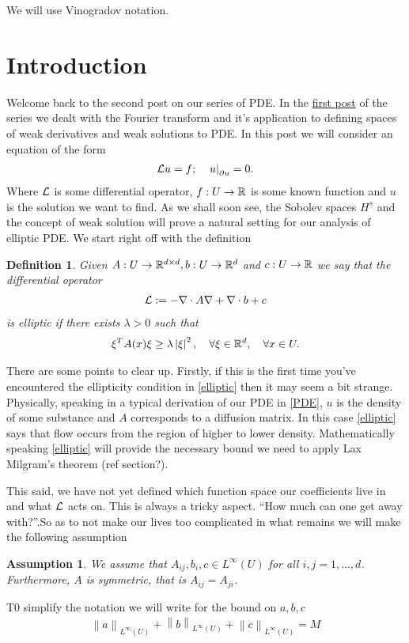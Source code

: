 \documentclass[12pt]{article}
\newtheorem{definition}{Definition}
\newtheorem{assumption}{Assumption}
\renewcommand{\norm}[1]{\left\lVert #1 \right\rVert}\renewcommand{\abs}[1]{\left| #1 \right|}
\newcommand\restr[2]{\left.#1\right|_{#2}}
\begin{document}
We will use Vinogradov notation.

\section{Introduction}
Welcome back to the second post on our series of PDE. In the \href{https://nowheredifferentiable.com/2023-01-29-PDE-1/}{first post} of the series we dealt with the Fourier transform and it's application to defining spaces of weak derivatives and weak solutions to PDE. In this post we will consider an equation of the form
\begin{align}\label{PDE}
	\Ll u =f; \quad \restr{u}{\partial u} =0.
\end{align}
Where $\mathcal{L}$ is some differential operator, $f: U \to  \mathbb{R}$  is some known function and $u$ is the solution we want to find. As we shall soon see, the Sobolev spaces $H^s$ and the concept of weak solution will prove a natural setting for our analysis of elliptic PDE. We start right off with the definition
\begin{definition}
	Given $A: U \to \mathbb{R}^{d \times d}, b: U \to \mathbb{R}^d$ and $c:U \to \mathbb{R}$ we say that the differential operator
	\begin{align}\label{operator}
		\mathcal{L}:= -\nabla \cdot A \nabla + \nabla \cdot b +c\end{align}
	is \emph{elliptic} if there exists $\lambda >0$ such that
	\begin{align}\label{elliptic}
		\xi ^TA(x) \xi  \geq \lambda \abs{\xi }^2 , \quad\forall \xi \in \R^d , \quad\forall x \in U .
	\end{align}
\end{definition}
There are some points to clear up. Firstly, if this is the first time you've encountered  the ellipticity condition in \eqref{elliptic} then it may seem a bit strange.  Physically, speaking in a typical derivation of our PDE in \eqref{PDE}, $u$ is the density of some substance and $A$ corresponds to a diffusion matrix. In this case \eqref{elliptic} says that flow occurs from the region of higher to lower density. Mathematically speaking \eqref{elliptic} will provide the necessary bound we need to apply Lax Milgram's theorem (ref section?).

This said, we have not yet defined which function space our coefficients live in and what $\mathcal{L}$ acts on. This is always a tricky aspect. ``How much can one get away with?''.So as to not make our lives too complicated in what remains we will make the following assumption
\begin{assumption}\label{Ass1}
	We assume that  $A_{ij}, b_i, c \in L^\infty (U)$ for all $i,j=1,\ldots,d$. Furthermore, $A$ is symmetric, that is  $A_{ij}=A_{ji}$.
\end{assumption}
T0 simplify the notation we will write for the bound on $a,b,c$
\begin{align*}
	\norm{a}_{L^\infty(U)}+\norm{b}_{L^\infty(U)}+\norm{c}_{L^\infty(U)}=M
\end{align*}
\end{document}
